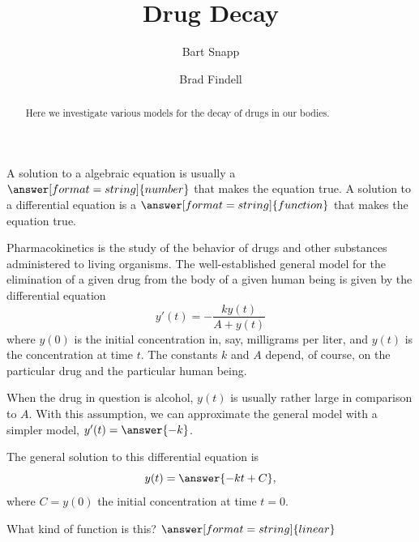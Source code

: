 \documentclass{ximera}
\title{Drug Decay}
\author{Bart Snapp \and Brad Findell}
\begin{document}
\begin{abstract}
Here we investigate various models for the decay of drugs in our bodies.  
\end{abstract}
\maketitle

\begin{question}
A solution to a algebraic equation is usually a $\answer[format=string]{number}$ that makes the equation true.  A solution to a differential equation is a $\answer[format=string]{function}$ that makes the equation true.  
\end{question}

Pharmacokinetics is the study of the behavior of drugs and other substances administered to living organisms.  
The well-established general model for 
the elimination of a given drug from the body of a given human being is given by the differential equation 
$$y'(t)=-\frac{ky(t)}{A+y(t)}$$
where $y(0)$ is the initial concentration in, say, milligrams per liter, and $y(t)$ is the concentration at time $t$.  The constants $k$ and $A$ depend, of course, on the particular drug and the particular human being. 


\begin{question}
When the drug in question is alcohol, $y(t)$ is usually rather large in comparison to $A$.   With this assumption, we can approximate the general model with a simpler model, $y'(t)=\answer{-k}$.    

The general solution to this differential equation is 
\[  
y(t) =\answer{ -kt + C}, 
\]
where $C=y(0)$ the initial concentration at time $t=0$.  

What kind of function is this? $\answer[format=string]{linear}$
\end{question}
\end{document}
